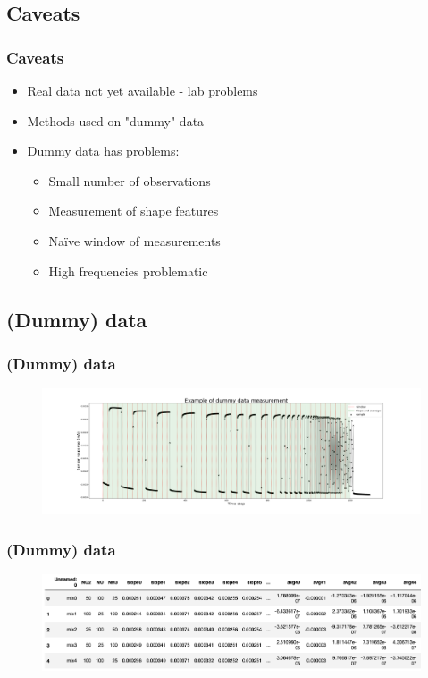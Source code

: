 \documentclass{beamer}
\begin{document}
\begin{frame}
	\section{Caveats}
	\frametitle{Caveats}
	
	\begin{itemize}
		\item Real data not yet available - lab problems
		\item Methods used on "dummy" data
		\item Dummy data has problems:
		\begin{itemize}
			\item Small number of observations
			\item Measurement of shape features
			\item Naïve window of measurements
			\item High frequencies problematic
		\end{itemize}
	\end{itemize}
	
\end{frame}

\begin{frame}
	\section{(Dummy) data}
	\frametitle{(Dummy) data}
	
	
	\begin{figure}[!htb]
		\centering
		\includegraphics[width=1.2\textwidth]{../../figures/dummy-data.png}
	\end{figure} 

\end{frame}

\begin{frame}
	\frametitle{(Dummy) data}
	
	\begin{figure}[!htb]
		\centering
		\includegraphics[width=1\textwidth]{../../figures/dummy-feats.png}
	\end{figure} 
	
 	\end{frame}
\end{document}

